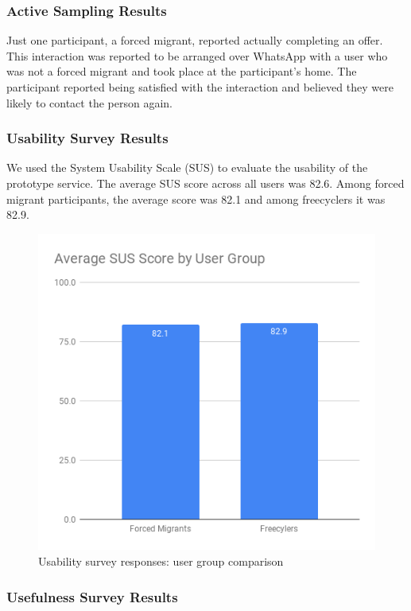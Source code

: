 \subsubsection*{Active Sampling Results}

Just one participant, a forced migrant, reported actually completing an offer. This interaction was reported to be arranged over WhatsApp with a user who was not a forced migrant and took place at the participant's home. The participant reported being satisfied with the interaction and believed they were likely to contact the person again.

\subsubsection*{Usability Survey Results}

We used the System Usability Scale (SUS) to evaluate the usability of the prototype service. The average SUS score across all users was 82.6. Among forced migrant participants, the average score was 82.1 and among freecyclers it was 82.9.

\begin{figure}[ht]
  \centering
  \includegraphics[scale=0.5]{images/sus_scores.png}
  \caption{Usability survey responses: user group comparison}
  \label{fig:sus_scores}
\end{figure}

\subsubsection*{Usefulness Survey Results}

